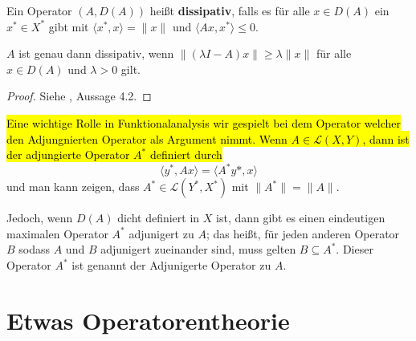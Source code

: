 Ein Operator $(A, D(A))$ heißt \textbf{dissipativ}, falls es für alle $x\in D(A)$ ein $x^*\in X^*$ gibt mit $\langle x^*, x\rangle = \|x\|$ und $\langle Ax, x^*\rangle \leq 0$.

\begin{prop}\label{Charakterisierung der Dissipativität}
$A$ ist genau dann dissipativ, wenn $\|(\lambda I- A)x\|\geq \lambda \|x\|$ für alle $x\in D(A)$ und $\lambda >0$ gilt.
\end{prop} 

\begin{proof}
Siehe  \cite{pazy_1983}, Aussage 4.2.
\end{proof}




\hl{Eine wichtige Rolle in Funktionalanalysis wir gespielt bei dem Operator welcher den Adjungnierten Operator als Argument nimmt. Wenn $A\in\mathcal L(X,Y)$, dann ist der adjungierte Operator $A^*$ definiert durch}
\begin{equation*}
\langle y^*, Ax\rangle =\langle A^*y*, x\rangle
\end{equation*}
und man kann zeigen, dass $A^*\in\mathcal L(Y^*, X^*)$ mit $\|A^*\|=\|A\|$.

\par 
Jedoch, wenn $D(A)$ dicht definiert in $X$ ist, dann gibt es einen eindeutigen maximalen Operator $A^*$ adjunigert zu $A$; das heißt, für jeden anderen Operator $B$ sodass $A$ und $B$ adjunigert zueinander sind, muss gelten $B\subseteq A^*$.  Dieser Operator $A^*$  ist genannt der Adjunigerte Operator zu $A$.


\section{Etwas Operatorentheorie}

